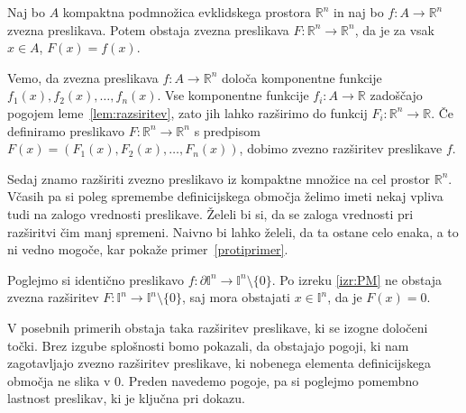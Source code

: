 \documentclass[mat1]{fmfdelo}
\newcommand{\R}{\mathbb R}
\newcommand{\I}{\mathbb I}
\newcommand{\0}{0}
\begin{document}
\begin{posledica}
Naj bo $A$ kompaktna podmnožica evklidskega prostora $\R^n$ in naj bo \mbox{$f : A \to \R^n$} zvezna preslikava. Potem obstaja zvezna preslikava $F : \R^n \to \R^n$, da je za vsak $x \in A$, $F(x) = f(x)$.
\end{posledica}

\begin{dokaz}
Vemo, da zvezna preslikava $f : A \to \R^n$ določa komponentne funkcije $f_1(x), f_2(x), \dots , f_n(x)$. Vse komponentne funkcije $f_i : A \to \R$ zadoščajo pogojem leme~\ref{lem:razsiritev}, zato jih lahko razširimo do funkcij $F_i : \R^n \to \R$. Če definiramo preslikavo $F : \R^n \to \R^n$ s predpisom $F(x) = (F_1(x), F_2(x), \dots , F_n(x))$, dobimo zvezno razširitev preslikave $f$.
\end{dokaz}
Sedaj znamo razširiti zvezno preslikavo iz kompaktne množice na cel prostor $\R^n$. Včasih pa si poleg spremembe definicijskega območja želimo imeti nekaj vpliva tudi na zalogo vrednosti preslikave. Želeli bi si, da se zaloga vrednosti pri razširitvi čim manj spremeni. Naivno bi lahko želeli, da ta ostane celo enaka, a to ni vedno mogoče, kar pokaže primer~\ref{protiprimer}.

\begin{primer}\label{protiprimer}
Poglejmo si identično preslikavo $f : \partial \I^n \to \I^n \setminus \{ \0 \}$. Po izreku \ref{izr:PM} ne obstaja zvezna razširitev $F : \I^n \to \I^n \setminus \{ \0 \}$, saj mora obstajati $x \in \I^n$, da je $F(x) = \0$. 
\end{primer}

V posebnih primerih obstaja taka razširitev preslikave, ki se izogne določeni točki. Brez izgube splošnosti bomo pokazali, da obstajajo pogoji, ki nam zagotavljajo zvezno razširitev preslikave, ki nobenega elementa definicijskega območja ne slika v $\0$. 
Preden navedemo pogoje, pa si poglejmo pomembno lastnost preslikav, ki je ključna pri dokazu.
\end{document}
